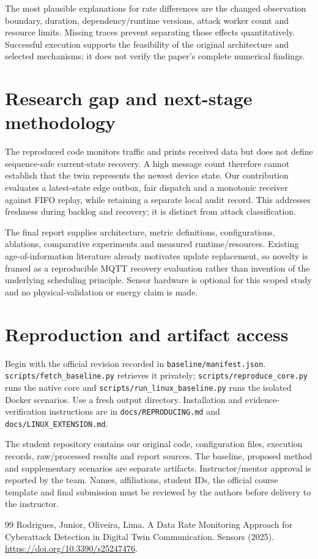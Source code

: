 \documentclass[11pt,a4paper]{article}
\begin{document}
The most plausible explanations for rate differences are the changed observation boundary, duration, dependency/runtime versions, attack worker count and resource limits. Missing traces prevent separating those effects quantitatively. Successful execution supports the feasibility of the original architecture and selected mechanisms; it does not verify the paper's complete numerical findings.


\section{Research gap and next-stage methodology}

The reproduced code monitors traffic and prints received data but does not define sequence-safe current-state recovery. A high message count therefore cannot establish that the twin represents the newest device state. Our contribution evaluates a latest-state edge outbox, fair dispatch and a monotonic receiver against FIFO replay, while retaining a separate local audit record. This addresses freshness during backlog and recovery; it is distinct from attack classification.


The final report supplies architecture, metric definitions, configurations, ablations, comparative experiments and measured runtime/resources. Existing age-of-information literature already motivates update replacement, so novelty is framed as a reproducible MQTT recovery evaluation rather than invention of the underlying scheduling principle. Sensor hardware is optional for this scoped study and no physical-validation or energy claim is made.


\section{Reproduction and artifact access}

Begin with the official revision recorded in \texttt{baseline/manifest.json}. \texttt{scripts/fetch\_baseline.py} retrieves it privately; \texttt{scripts/reproduce\_core.py} runs the native core and \texttt{scripts/run\_linux\_baseline.py} runs the isolated Docker scenarios. Use a fresh output directory. Installation and evidence-verification instructions are in \texttt{docs/REPRODUCING.md} and \texttt{docs/LINUX\_EXTENSION.md}.


The student repository contains our original code, configuration files, execution records, raw/processed results and report sources. The baseline, proposed method and supplementary scenarios are separate artifacts. Instructor/mentor approval is reported by the team. Names, affiliations, student IDs, the official course template and final submission must be reviewed by the authors before delivery to the instructor.

\begin{thebibliography}{99}
 Rodrigues, Junior, Oliveira, Lima. A Data Rate Monitoring Approach for Cyberattack Detection in Digital Twin Communication. Sensors (2025). \url{https://doi.org/10.3390/s25247476}.
\end{thebibliography}
\end{document}
